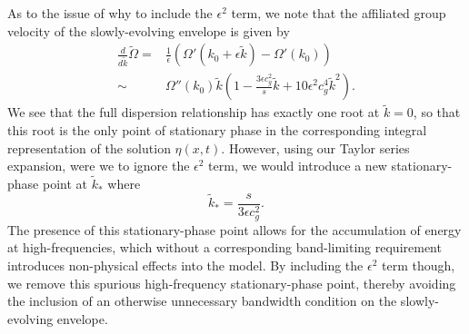 \documentclass[a4paper,11pt]{article}
\begin{document}
As to the issue of why to include the $\epsilon^{2}$ term, we note that the affiliated group velocity of the slowly-evolving envelope is given by 
\begin{align*}
\frac{d}{d\tilde{k}}\tilde{\Omega} = & \frac{1}{\epsilon}\left(\Omega'(k_{0}+\epsilon \tilde{k}) - \Omega'(k_{0})\right)\\
\sim & \Omega''(k_{0})\tilde{k}\left(1 - \frac{3\epsilon c_{g}^{2}}{s}\tilde{k} + 10 \epsilon^{2}c_{g}^{4}\tilde{k}^{2}\right).
\end{align*}
We see that the full dispersion relationship has exactly one root at $\tilde{k}=0$, so that this root is the only point of stationary phase in the corresponding integral representation of the solution $\eta(x,t)$.  However, using our Taylor series expansion, were we to ignore the $\epsilon^{2}$ term, we would introduce a new stationary-phase point at $\tilde{k}_{\ast}$ where
\[
\tilde{k}_{\ast} = \frac{s}{3\epsilon c_{g}^{2}}.
\]
The presence of this stationary-phase point allows for the accumulation of energy at high-frequencies, which without a corresponding band-limiting requirement introduces non-physical effects into the model.  By including the $\epsilon^{2}$ term though, we remove this spurious high-frequency stationary-phase point, thereby avoiding the inclusion of an otherwise unnecessary bandwidth condition on the slowly-evolving envelope.       
\end{document}
